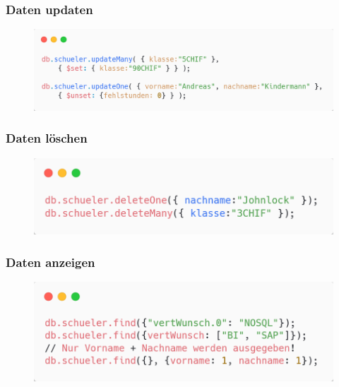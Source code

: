 \subsubsection{Daten updaten}
\begin{figure}[H]
    \centering
    \includegraphics[scale=.3]{res/themenkorb_8/mongo_update.png}
\end{figure}
\subsubsection{Daten löschen}
\begin{figure}[H]
    \centering
    \includegraphics[scale=.3]{res/themenkorb_8/mongo_delete.png}
\end{figure}
\subsubsection{Daten anzeigen}
\begin{figure}[H]
    \centering
    \includegraphics[scale=.3]{res/themenkorb_8/mongo_find.png}
\end{figure}